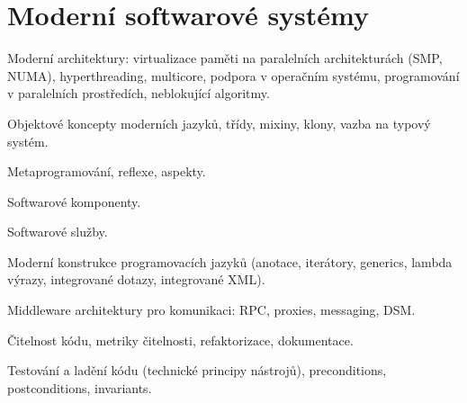 \newpage
\section{Moderní softwarové systémy}
\begin{pozadavky}
\begin{pitemize}
\item Moderní architektury: virtualizace paměti na paralelních architekturách (SMP, NUMA), hyperthreading, multicore, podpora v operačním systému, programování v paralelních prostředích, neblokující algoritmy.
\item Objektové koncepty moderních jazyků, třídy, mixiny, klony, vazba na typový systém.
\item Metaprogramování, reflexe, aspekty.
\item Softwarové komponenty.
\item Softwarové služby.
\item Moderní konstrukce programovacích jazyků (anotace, iterátory, generics, lambda výrazy, integrované dotazy, integrované XML).
\item Middleware architektury pro komunikaci: RPC, proxies, messaging, DSM.
\item Čitelnost kódu, metriky čitelnosti, refaktorizace, dokumentace.
\item Testování a ladění kódu (technické principy nástrojů), preconditions, postconditions, invariants.
\end{pitemize}
\end{pozadavky}